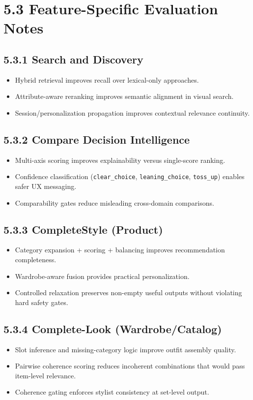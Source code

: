 \documentclass[12pt,a4paper]{report}
\begin{document}
\section{5.3 Feature-Specific Evaluation Notes}
\subsection{5.3.1 Search and Discovery}
\begin{itemize}
\item Hybrid retrieval improves recall over lexical-only approaches.
\item Attribute-aware reranking improves semantic alignment in visual search.
\item Session/personalization propagation improves contextual relevance continuity.
\end{itemize}

\subsection{5.3.2 Compare Decision Intelligence}
\begin{itemize}
\item Multi-axis scoring improves explainability versus single-score ranking.
\item Confidence classification (\texttt{clear\_choice}, \texttt{leaning\_choice}, \texttt{toss\_up}) enables safer UX messaging.
\item Comparability gates reduce misleading cross-domain comparisons.
\end{itemize}

\subsection{5.3.3 CompleteStyle (Product)}
\begin{itemize}
\item Category expansion + scoring + balancing improves recommendation completeness.
\item Wardrobe-aware fusion provides practical personalization.
\item Controlled relaxation preserves non-empty useful outputs without violating hard safety gates.
\end{itemize}

\subsection{5.3.4 Complete-Look (Wardrobe/Catalog)}
\begin{itemize}
\item Slot inference and missing-category logic improve outfit assembly quality.
\item Pairwise coherence scoring reduces incoherent combinations that would pass item-level relevance.
\item Coherence gating enforces stylist consistency at set-level output.
\end{itemize}
\end{document}
